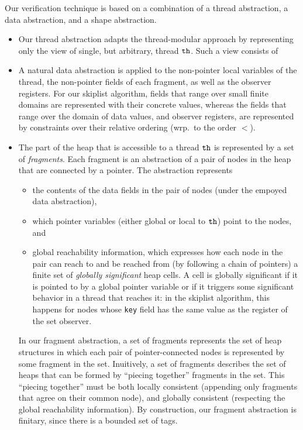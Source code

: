 Our verification technique is based on a combination of a thread abstraction, a
data  abstraction, and a shape abstraction.
\begin{itemize}
  \item
  Our thread abstraction adapts the thread-modular approach by representing only the view of single, but arbitrary, thread ${\tt th}$. Such a view consists of
\item
A natural data abstraction is applied to the non-pointer local
variables of the thread, the non-pointer fields of each fragment, as well as
the observer registers. For our
skiplist algorithm, fields that range over small finite domains are represented
with their concrete values, whereas the fields that range over the domain of
data values, and observer registers,
are represented by constraints over their relative ordering
(wrp.\ to the order $<$).
\item
The part of the heap that is accessible to a thread ${\tt th}$ is represented by  
a set of {\em fragments}. Each fragment is an abstraction of a pair of
nodes in the heap that are connected by a pointer. The abstraction represents
\begin{itemize}
\item the contents of the data fields in the pair of nodes (under the empoyed
  data abstraction),
\item which pointer variables (either global or local to ${\tt th}$)
  point  to the nodes, and
\item global reachability information, which expresses how
  each node in the pair can reach to and be reached from
  (by following a chain of pointers) a finite set of {\em globally significant}
  heap cells. A cell is globally significant if it is pointed to by a
  global pointer variable or if it triggers some significant behavior in
  a thread that reaches it: in the 
  skiplist algorithm, this happens for nodes whose
  {\tt key} field has the  same value as the register of the set observer.
\end{itemize}
In our fragment abstraction, a set of fragments represents the set of heap
structures in which each pair of pointer-connected nodes is represented by some
fragment in the set.
Inuitively, a set of fragments describes the set of heaps that can be formed by
``piecing together'' fragments in the set. This ``piecing together'' must
be both locally consistent (appending only fragments that agree on their
common node), and globally consistent (respecting the global reachability
information).
By construction, our fragment abstraction is finitary, since there is
a bounded set of tags.
\end{itemize}
